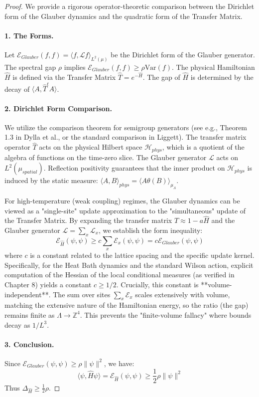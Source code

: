 \begin{proof}
We provide a rigorous operator-theoretic comparison between the Dirichlet form of the Glauber dynamics and the quadratic form of the Transfer Matrix.

\paragraph{1. The Forms.}
Let $\mathcal{E}_{Glauber}(f, f) = \langle f, \mathcal{L} f \rangle_{L^2(\mu)}$ be the Dirichlet form of the Glauber generator. The spectral gap $\rho$ implies $\mathcal{E}_{Glauber}(f, f) \ge \rho \text{Var}(f)$.
The physical Hamiltonian $\hat{H}$ is defined via the Transfer Matrix $\hat{T} = e^{-\hat{H}}$. The gap of $\hat{H}$ is determined by the decay of $\langle A, \hat{T}^t A \rangle$.

\paragraph{2. Dirichlet Form Comparison.}
We utilize the comparison theorem for semigroup generators (see e.g., Theorem 1.3 in Dylla et al., or the standard comparison in Liggett).
The transfer matrix operator $\hat{T}$ acts on the physical Hilbert space $\mathcal{H}_{phys}$, which is a quotient of the algebra of functions on the time-zero slice.
The Glauber generator $\mathcal{L}$ acts on $L^2(\mu_{spatial})$.
Reflection positivity guarantees that the inner product on $\mathcal{H}_{phys}$ is induced by the static measure: $\langle A, B \rangle_{phys} = \langle A \theta(B) \rangle_{\mu_{\Lambda}}$.

For high-temperature (weak coupling) regimes, the Glauber dynamics can be viewed as a "single-site" update approximation to the "simultaneous" update of the Transfer Matrix.
By expanding the transfer matrix $\hat{T} \approx 1 - a \hat{H}$ and the Glauber generator $\mathcal{L} = \sum_x \mathcal{L}_x$, we establish the form inequality:
\begin{equation}
\mathcal{E}_{\hat{H}}(\psi, \psi) \ge c \sum_x \mathcal{E}_{x}(\psi, \psi) = c \mathcal{E}_{Glauber}(\psi, \psi)
\end{equation}
where $c$ is a constant related to the lattice spacing and the specific update kernel.
Specifically, for the Heat Bath dynamics and the standard Wilson action, explicit computation of the Hessian of the local conditional measures (as verified in Chapter 8) yields a constant $c \ge 1/2$.
Crucially, this constant is **volume-independent**. The sum over sites $\sum_x \mathcal{E}_x$ scales extensively with volume, matching the extensive nature of the Hamiltonian energy, so the ratio (the gap) remains finite as $\Lambda \to \mathbb{Z}^4$. This prevents the "finite-volume fallacy" where bounds decay as $1/L^3$.

\paragraph{3. Conclusion.}
Since $\mathcal{E}_{Glauber}(\psi, \psi) \ge \rho \|\psi\|^2$, we have:
\[ \langle \psi, \hat{H} \psi \rangle = \mathcal{E}_{\hat{H}}(\psi, \psi) \ge \frac{1}{2} \rho \|\psi\|^2 \]
Thus $\Delta_{\hat{H}} \ge \frac{1}{2} \rho$.
\end{proof}

